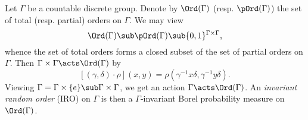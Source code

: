 \documentclass[../main.tex]{subfiles}
\begin{document}
\begin{definition}\label{def:iro}
    Let $ \Gamma $ be a countable discrete group. Denote by $ \Ord(\Gamma) $ (resp. $ \pOrd(\Gamma) $) the set of total (resp. partial) orders on $ \Gamma $. We may view 
    \[
        \Ord(\Gamma)\sub \pOrd(\Gamma) \sub \{0,1\}^{\Gamma\times \Gamma},
    \]
    whence the set of total orders forms a closed subset of the set of partial orders on $ \Gamma $. Then $ \Gamma\times \Gamma\acts \Ord(\Gamma) $ by
    \[
        [(\gamma, \delta) \cdot \rho] (x,y) = \rho(\gamma^{-1}x \delta, \gamma^{-1}y \delta).
    \]
    Viewing $ \Gamma = \Gamma\times\{e\}\sub \Gamma\times \Gamma $, we get an action $ \Gamma\acts \Ord(\Gamma) $. An \textit{invariant random order} (IRO) on $ \Gamma $ is then a $ \Gamma $-invariant Borel probability measure on $ \Ord(\Gamma) $.
\end{definition}
\end{document}
